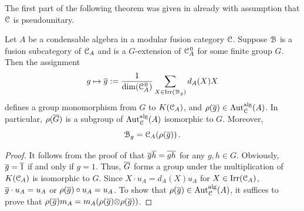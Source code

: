 \documentclass{amsart}
\begin{document}
The first part of the following theorem was given in \cite[Prop. 5.8]{DNRX2025} already with assumption that ${\EuScript{C}}$ is pseudounitary.
 \begin{thm}\label{p5.17}
Let $A$ be a condensable algebra in a modular fusion category ${\EuScript{C}}$. Suppose ${\EuScript{B}}$ is a fusion subcategory of ${{\EuScript{C}}_A}$ and is a $G$-extension of ${{\EuScript{C}}_A^{\hspace{1pt}0}}$ for some finite group $G$. Then the assignment $$g \mapsto \overline g := \frac{1}{\dim({{\EuScript{C}}_A^{\hspace{1pt}0}})} \sum_{X \in \operatorname{Irr}({\EuScript{B}}_g)}d_A(X) X$$ defines a group monomorphism from $G$ to ${K({{\EuScript{C}}_A})}$, and $\rho(\overline g) \in {\operatorname{Aut}_{\EuScript{C}}^{\operatorname{alg}}}(A)$. In particular, $\rho(\overline G)$ is a subgroup of ${\operatorname{Aut}_{\EuScript{C}}^{\operatorname{alg}}}(A)$  isomorphic to $G$. Moreover,
$$
{\EuScript{B}}_g = {{\EuScript{C}}_A}(\rho(\overline g))\,.
$$
\end{thm}

\begin{proof}
It follows from the proof of \cite[Thm. 3.5.2]{EGNO} that $\overline{g}\overline{h} = \overline{gh}$ for any $g, h \in G$. Obviously, $\overline g = \overline 1$ if and only if $g=1$. Thus, $\overline G$ forms a group under the multiplication of ${K({{\EuScript{C}}_A})}$ is isomorphic to $G$. Since $X \cdot u_A = d_A(X) u_A$ for $X \in {\operatorname{Irr}({\EuScript{C}}_A)}$, $\overline g \cdot u_A = u_A$ or $\rho(\overline g)\circ u_A = u_A$. To show that $\rho(\overline g) \in {\operatorname{Aut}_{\EuScript{C}}^{\operatorname{alg}}}(A)$, it suffices to prove that $\rho(\overline{g}) m_A = m_A (\rho(\overline{g}) {\otimes}  \rho(\overline{g}))$. 


\end{proof}
\end{document}
